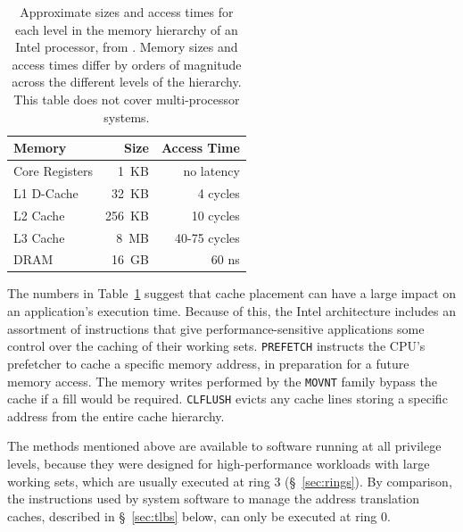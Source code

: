 
\begin{table}[hbt]
  \centering
  \begin{tabular}{| l | r | r |}
  \hline
  \textbf{Memory} & \textbf{Size} & \textbf{Access Time}\\
  \hline
  Core Registers & 1~KB & no latency \\
  \hline
  L1 D-Cache & 32~KB & 4 cycles \\
  \hline
  L2 Cache & 256~KB & 10 cycles \\
  \hline
  L3 Cache & 8~MB & 40-75 cycles \\
  \hline
  DRAM & 16~GB & 60 ns \\
  \hline
  \end{tabular}
  \caption{
    Approximate sizes and access times for each level in the memory
    hierarchy of an Intel processor, from \cite{intel2010perfanalysis}. Memory
    sizes and access times differ by orders of magnitude across the different
    levels of the hierarchy. This table does not cover multi-processor systems.
  }
  \label{fig:cache_timings}
\end{table}


The numbers in Table~\ref{fig:cache_timings} suggest that cache placement can
have a large impact on an application's execution time. Because of this, the
Intel architecture includes an assortment of instructions that give
performance-sensitive applications some control over the caching of their
working sets. \texttt{PREFETCH} instructs the CPU's prefetcher to cache a
specific memory address, in preparation for a future memory access. The memory
writes performed by the \texttt{MOVNT} family bypass the cache if a fill would
be required. \texttt{CLFLUSH} evicts any cache lines storing a specific
address from the entire cache hierarchy.

The methods mentioned above are available to software running at all privilege
levels, because they were designed for high-performance workloads with large
working sets, which are usually executed at ring 3 (\S~\ref{sec:rings}). By
comparison, the instructions used by system software to manage the address
translation caches, described in \S~\ref{sec:tlbs} below, can only be executed
at ring 0.


